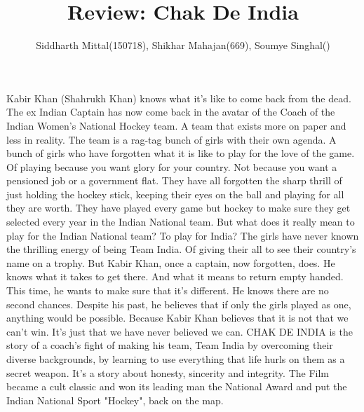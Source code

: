 \documentclass[titlepage]{article}
\title{Review: Chak De India}
\author{Siddharth Mittal(150718), Shikhar Mahajan(669), Soumye Singhal()}
\begin{document}
\maketitle

\section*{}
Kabir Khan (Shahrukh Khan) knows what it's like to come back from the dead. The ex Indian Captain has now come back in the avatar of the Coach of the Indian Women's National Hockey team. A team that exists more on paper and less in reality. The team is a rag-tag bunch of girls with their own agenda. A bunch of girls who have forgotten what it is like to play for the love of the game. Of playing because you want glory for your country. Not because you want a pensioned job or a government flat. They have all forgotten the sharp thrill of just holding the hockey stick, keeping their eyes on the ball and playing for all they are worth. They have played every game but hockey to make sure they get selected every year in the Indian National team. But what does it really mean to play for the Indian National team? To play for India? The girls have never known the thrilling energy of being Team India. Of giving their all to see their country's name on a trophy. But Kabir Khan, once a captain, now forgotten, does. He knows what it takes to get there. And what it means to return empty handed. This time, he wants to make sure that it's different. He knows there are no second chances. Despite his past, he believes that if only the girls played as one, anything would be possible. Because Kabir Khan believes that it is not that we can't win. It's just that we have never believed we can. CHAK DE INDIA is the story of a coach's fight of making his team, Team India by overcoming their diverse backgrounds, by learning to use everything that life hurls on them as a secret weapon. It's a story about honesty, sincerity and integrity. The Film became a cult classic and won its leading man the National Award and put the Indian National Sport "Hockey", back on the map.
\end{document}
